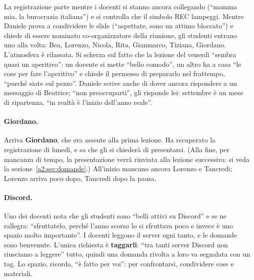 La registrazione parte mentre i docenti si stanno ancora collegando (``mamma
mia, la burocrazia italiana'') e si controlla che il simbolo REC lampeggi.
Mentre Daniele prova a condividere le slide (``aspettate, sono un attimo
bloccato'') e chiede di essere nominato co-organizzatore della riunione, gli
studenti entrano uno alla volta: Bea, Lorenzo, Nicola, Rita, Gianmarco,
Tiziana, Giordano. L'atmosfera è rilassata. Si scherza sul fatto che la lezione
del venerdì ``sembra quasi un aperitivo'': un docente si mette ``bello comodo'',
un altro ha a casa ``le cose per fare l'aperitivo'' e chiede il permesso di
prepararlo nel frattempo, ``purché siate sul pezzo''. Daniele scrive anche di
dover ancora rispondere a un messaggio di Beatrice; ``non preoccuparti'', gli
risponde lei: settembre è un mese di ripartenza, ``in realtà è l'inizio
dell'anno reale''.

\paragraph{Giordano.} Arriva \textbf{Giordano}, che era assente alla prima
lezione. Ha recuperato la registrazione di lunedì, e sa che gli si chiederà di
presentarsi. (Alla fine, per mancanza di tempo, la presentazione verrà rinviata
alla lezione successiva: si veda la sezione~\ref{a2:sec:domande}.) All'inizio
mancano ancora Lorenzo e Tancredi; Lorenzo arriva poco dopo, Tancredi dopo la
pausa.

\paragraph{Discord.} Uno dei docenti nota che gli studenti sono ``belli attivi
su Discord'' e se ne rallegra: ``sfruttatelo, perché l'anno scorso lo si
sfruttava poco e invece è uno spazio molto importante''. I docenti leggono il
server ogni tanto, e le domande sono benvenute. L'unica richiesta è
\textbf{taggarli}: ``tra tanti server Discord non riusciamo a leggere'' tutto,
quindi una domanda rivolta a loro va segnalata con un tag. Lo spazio, ricorda,
``è fatto per voi'': per confrontarsi, condividere cose e materiali.


